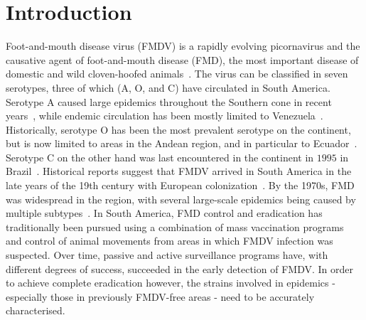 \documentclass[10pt]{article}
\begin{document}
\section*{Introduction}

Foot-and-mouth disease virus (FMDV) is a rapidly evolving picornavirus and the causative agent of foot-and-mouth disease (FMD), the most important disease of domestic and wild cloven-hoofed animals~\cite{review}.
The virus can be classified in seven serotypes, three of which (A, O, and C) have circulated in South America.
Serotype A caused large epidemics throughout the Southern cone in recent years~\cite{Perez2001, Malirat2012}, while endemic circulation has been mostly limited to Venezuela~\cite{Malirat2012}.
Historically, serotype O has been the most prevalent serotype on the continent, but is now limited to areas in the Andean region, and in particular to Ecuador~\cite{andean}.
Serotype C on the other hand was last encountered in the continent in $1995$ in Brazil~\cite{review_eradication}.
Historical reports suggest that FMDV arrived in South America in the late years of the 19th century with European colonization~\cite{Naranjo2013, tully}. 
By the 1970s, FMD was widespread in the region, with several large-scale epidemics being caused by multiple subtypes~\cite{Saraiva2003}.
In South America, FMD control and eradication has traditionally been pursued using a combination of mass vaccination programs~\cite{vaccinationSA} and control of animal movements from areas in which FMDV infection was suspected.
Over time, passive and active surveillance programs have, with different degrees of success, succeeded in the early detection of FMDV.
In order to achieve complete eradication however, the strains involved in epidemics - especially those in previously FMDV-free areas - need to be accurately characterised.
\end{document}
